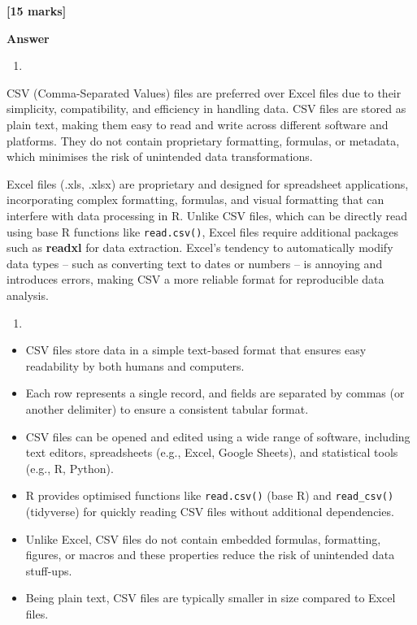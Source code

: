 \documentclass[
  10t,
]{article}
\providecommand{\tightlist}{%
  \setlength{\itemsep}{0pt}\setlength{\parskip}{0pt}}
\let\oldtexttt\texttt
\renewcommand{\texttt}[1]{\oldtexttt{\small #1}}
\begin{document}
\textbf{{[}15 marks{]}}

\textbf{Answer}

\begin{enumerate}
\def\labelenumi{\alph{enumi})}
\tightlist
\item
\end{enumerate}

CSV (Comma-Separated Values) files are preferred over Excel files due to
their simplicity, compatibility, and efficiency in handling data. CSV
files are stored as plain text, making them easy to read and write
across different software and platforms. They do not contain proprietary
formatting, formulas, or metadata, which minimises the risk of
unintended data transformations.

Excel files (.xls, .xlsx) are proprietary and designed for spreadsheet
applications, incorporating complex formatting, formulas, and visual
formatting that can interfere with data processing in R. Unlike CSV
files, which can be directly read using base R functions like
\texttt{read.csv()}, Excel files require additional packages such as
\textbf{readxl} for data extraction. Excel's tendency to automatically
modify data types -- such as converting text to dates or numbers -- is
annoying and introduces errors, making CSV a more reliable format for
reproducible data analysis.

\begin{enumerate}
\def\labelenumi{\alph{enumi})}
\setcounter{enumi}{1}
\tightlist
\item
\end{enumerate}

\begin{itemize}
\tightlist
\item
  CSV files store data in a simple text-based format that ensures easy
  readability by both humans and computers.
\item
  Each row represents a single record, and fields are separated by
  commas (or another delimiter) to ensure a consistent tabular format.
\item
  CSV files can be opened and edited using a wide range of software,
  including text editors, spreadsheets (e.g., Excel, Google Sheets), and
  statistical tools (e.g., R, Python).
\item
  R provides optimised functions like \texttt{read.csv()} (base R) and
  \texttt{read\_csv()} (tidyverse) for quickly reading CSV files without
  additional dependencies.
\item
  Unlike Excel, CSV files do not contain embedded formulas, formatting,
  figures, or macros and these properties reduce the risk of unintended
  data stuff-ups.
\item
  Being plain text, CSV files are typically smaller in size compared to
  Excel files.
\end{itemize}
\end{document}

